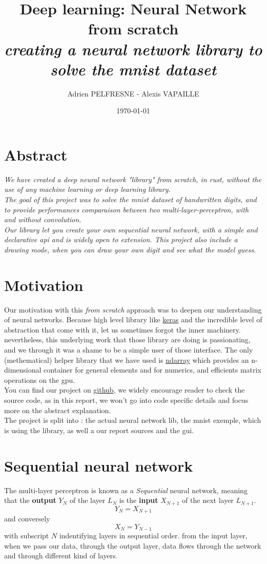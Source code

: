 \documentclass[a4paper, twocolumn, twoside]{article}
\title{Deep learning: Neural Network from scratch\\
\textit{creating a neural network library to solve the mnist dataset}}
\author{Adrien PELFRESNE - Alexis VAPAILLE}
\date{\today}
\begin{document}
	\onecolumn
    \maketitle
	\tableofcontents

	\twocolumn
	\section{Abstract}
	\textit{We have created a deep neural network "library" from scratch, in rust, without the use of any machine learning or deep learning library.\\
	The goal of this project was to solve the mnist dataset of handwritten digits, and to provide performances comparaison between
	two multi-layer-perceptron, with and without convolution.\\
	Our library let you create your own sequential neural network, with a simple and declarative api and is widely open to extension.
	This project also include a drawing mode, when you can draw your own digit and see what the model guess.
	}

	\section{Motivation}
	Our motivation with this \textit{from scratch} approach was to deepen our understanding of neural networks.
	Because high level library like \href{https://keras.io/}{keras} and the incredible level of abstraction that come with it,
	let us sometimes forgot the inner machinery. nevertheless,
	this underlying work that those library are doing is passionating, and we through it was a shame to be a simple user of those interface.
	The only (methematical) helper library that we have used is \href{https://crates.io/crates/ndarray}{ndarray}
	which provides an n-dimensional container for general elements and for numerics, and efficients matrix operations on the gpu.\\
	You can find our project on \href{https://github.com/dirdr/neural_network_from_scratch}{github}, we widely encourage reader to check the source code,
	as in this report, we won't go into code specific details and focus more on the abstract explanation.\\
	The project is split into : the actual neural network lib, the mnist exemple, which is using the library, as well a our report sources and the gui.

	\section{Sequential neural network}
	The multi-layer perceptron is known  as a \textit{Sequential} neural network, meaning that the \textbf{output}
	$Y_N$ of the layer $L_N$ is the \textbf{input} $X_{N+1}$ of the next layer $L_{N+1}$.\\
	$$
	Y_{N} = X_{N+1}
	$$
	and conversely
	$$
	X_{N} = Y_{N-1}
	$$
	with subscript $N$ indentifying layers in sequential order.
	from the input layer, when we pass our data, through the output layer, data flows through the network and through different kind of layers.
\end{document}
